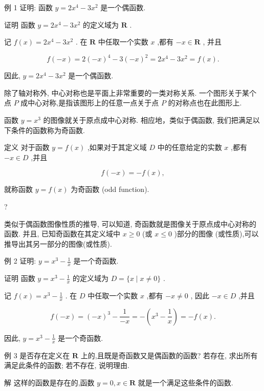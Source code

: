 \documentclass[10pt]{article}
\begin{document}
例 1 证明: 函数 \(y = 2{x}^{4} - 3{x}^{2}\) 是一个偶函数.

证明 函数 \(y = 2{x}^{4} - 3{x}^{2}\) 的定义域为 \(\mathbf{R}\) .

记 \(f\left( x\right)  = 2{x}^{4} - 3{x}^{2}\) . 在 \(\mathbf{R}\) 中任取一个实数 \(x\) ,都有 \(- x \in  \mathbf{R}\) , 并且

\[
f\left( {-x}\right)  = 2{\left( -x\right) }^{4} - 3{\left( -x\right) }^{2} = 2{x}^{4} - 3{x}^{2} = f\left( x\right) .
\]

因此, \(y = 2{x}^{4} - 3{x}^{2}\) 是一个偶函数.





除了轴对称外, 中心对称也是平面上非常重要的一类对称关系. 一个图形关于某个点 \(P\) 成中心对称,是指该图形上的任意一点关于点 \(P\) 的对称点也在此图形上.

函数 \(y = {x}^{3}\) 的图像就关于原点成中心对称. 相应地，类似于偶函数, 我们把满足以下条件的函数称为奇函数.

定义 对于函数 \(y = f\left( x\right)\) ,如果对于其定义域 \(D\) 中的任意给定的实数 \(x\) ,都有 \(- x \in  D\) ,并且

\[
f\left( {-x}\right)  =  - f\left( x\right) ,
\]

就称函数 \(y = f\left( x\right)\) 为奇函数 (odd function).

?

类似于偶函数图像性质的推导, 可以知道, 奇函数就是图像关于原点成中心对称的函数. 并且, 已知奇函数在其定义域中 \(x \geq  0\) (或 \(x \leq  0\) )部分的图像 (或性质),可以推导出其另一部分的图像(或性质).

例 2 证明: \(y = {x}^{3} - \frac{1}{x}\) 是一个奇函数.

证明 函数 \(y = {x}^{3} - \frac{1}{x}\) 的定义域为 \(D = \{ x \mid  x \neq  0\}\) .

记 \(f\left( x\right)  = {x}^{3} - \frac{1}{x}\) . 在 \(D\) 中任取一个实数 \(x\) ,都有 \(- x \neq  0\) , 因此 \(- x \in  D\) ,并且

\[
f\left( {-x}\right)  = {\left( -x\right) }^{3} - \frac{1}{-x} =  - \left( {{x}^{3} - \frac{1}{x}}\right)  =  - f\left( x\right) .
\]

因此, \(y = {x}^{3} - \frac{1}{x}\) 是一个奇函数.

例 3 是否存在定义在 \(\mathbf{R}\) 上的,且既是奇函数又是偶函数的函数? 若存在, 求出所有满足此条件的函数; 若不存在, 说明理由.

解 这样的函数是存在的,函数 \(y = 0,x \in  \mathbf{R}\) 就是一个满足这些条件的函数.
\end{document}
